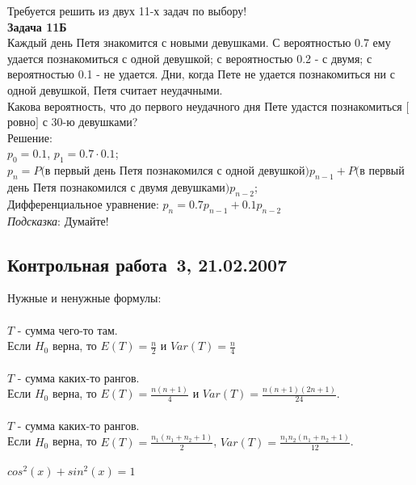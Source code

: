 \documentclass[pdftex,12pt,a4paper]{article}
\begin{document}
Требуется решить \textbf{} из двух 11-х задач по
выбору! \\



\textbf{Задача 11Б} \\
Каждый день Петя знакомится с новыми девушками. С вероятностью 0.7
ему удается познакомиться с одной девушкой; с вероятностью 0.2 - с
двумя; с вероятностью 0.1 - не удается. Дни, когда Пете не удается
познакомиться ни с одной девушкой, Петя считает неудачными. \\
Какова вероятность, что до первого неудачного дня Пете удастся
познакомиться $[$ровно$]$ с 30-ю девушками? \\
Решение: \\
$p_{0}=0.1$, $p_{1}=0.7\cdot 0.1$; \\
$p_{n}=P($в первый день Петя познакомился с одной
девушкой$)p_{n-1}+P($в первый день Петя познакомился с двумя
девушками$)p_{n-2}$; \\
Дифференциальное уравнение: $p_{n}=0.7p_{n-1}+0.1p_{n-2}$ \\


\emph{Подсказка}: Думайте! \\


\subsection{Контрольная работа \No\,3, 21.02.2007}

Нужные и ненужные формулы: \\ \\
$T$ - сумма чего-то там. \\
Если $H_{0}$ верна, то $E(T)=\frac{n}{2}$ и $Var(T)=\frac{n}{4}$ \\ \\
$T$ - сумма каких-то рангов. \\
Если $H_{0}$ верна, то $E(T)=\frac{n(n+1)}{4}$ и
$Var(T)=\frac{n(n+1)(2n+1)}{24}$. \\ \\
$T$ - сумма каких-то рангов. \\
Если $H_{0}$ верна, то $E(T)=\frac{n_{1}(n_{1}+n_{2}+1)}{2}$,
$Var(T)=\frac{n_{1}n_{2}(n_{1}+n_{2}+1)}{12}$. \\ \\
$cos^{2}(x)+sin^{2}(x)=1$ \\ \\ \\ \\
\end{document}
